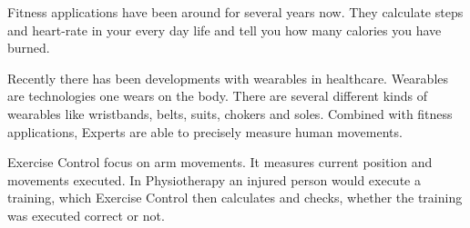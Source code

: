 
Fitness applications have been around for several years now. They calculate steps and heart-rate in your every day life and tell you how many calories you have burned. 

Recently there has been developments with wearables in healthcare.
Wearables are technologies one wears on the body. There are several different kinds of wearables like wristbands, belts, suits, chokers and soles. Combined with fitness applications, Experts are able to precisely measure human movements. 

Exercise Control focus on arm movements. It measures current position and movements executed. In Physiotherapy an injured person would execute a training, which Exercise Control then calculates and checks, whether the training was executed correct or not.